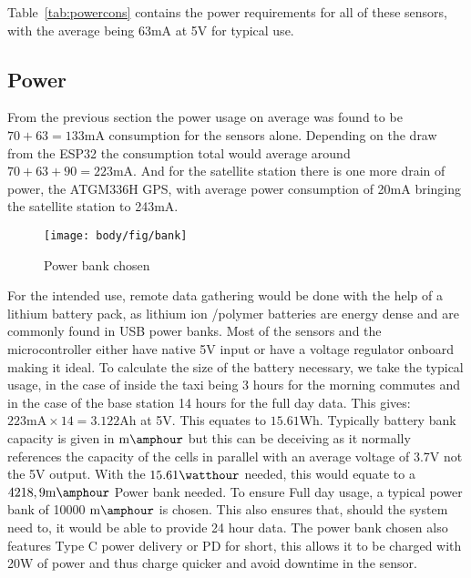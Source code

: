 \noindent Table~\ref{tab:powercons} \cite{sen55} contains the power requirements for all of these sensors, with the average being 63mA at 5V for typical use.

\subsection{Power}
From the previous section the power usage on average was found to be $ 70 +  63 = 133\si{\milli\ampere}$ consumption for the sensors alone. Depending on the draw from the ESP32 the consumption total would average around $ 70 +  63 + 90 = 223\si{\milli\ampere}$\cite{wifiespnow}.
And for the satellite station there is one more drain of power, the ATGM336H GPS, with average power consumption of 20mA\cite{atgm336h} bringing the satellite station to 243mA.
%

\begin{figure}[!htb]
	\centering
	\texttt{[image: body/fig/bank]}
	\caption{Power bank chosen}
	\label{fig:bank}
\end{figure}


\noindent
For the intended use, remote data gathering would be done with the help of a lithium battery pack, as lithium ion /polymer batteries are energy dense and are commonly found in USB power banks. Most of the sensors and the microcontroller either have native 5V input or have a voltage regulator onboard making it ideal. To calculate the size of the battery necessary, we take the typical usage, in the case of inside the taxi being 3 hours for the morning commutes and in the case of the base station 14 hours for the full day data. This gives: $223\si{\milli\ampere} \times 14 = 3.122 \si{\ampere\hour} $ at 5V. This equates to $15.61 \si{\watt\hour}$. Typically battery bank capacity is given in $ \si{\milli\amphour} $ but this can be deceiving as it normally references the capacity of the cells in parallel with an average voltage of 3.7V not the 5V output. With the $15.61 \si{\watthour}$ needed, this would equate to a  $ 4218,9\si{\milli\amphour} $ Power bank needed. To ensure Full day usage, a typical power bank of 10000 $ \si{\milli\amphour} $ is chosen. This also ensures that, should the system need to, it would be able to provide 24 hour data.
The power bank chosen also features Type C power delivery or PD for short, this allows it to be charged with 20$ \si{\watt} $ of power and thus charge quicker and avoid downtime in the sensor.



